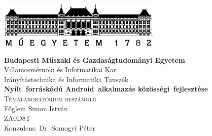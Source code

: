 \begin{titlepage}
	\begin{center}
		\includegraphics[keepaspectratio, width=8cm]{include/BME1782.eps} \\
		\vspace{5mm}

		\large \textbf{Budapesti Műszaki és Gazdaságtudományi Egyetem} \\
		Villamosmérnöki és Informatikai Kar \\
		Irányítástechnika és Informatika Tanszék \\
		\vspace{3cm}
		\huge \textbf{Nyílt~forráskódú Android~alkalmazás közösségi~fejlesztése}  \\
		\vspace{1cm}
		\textsc{Témalaboratórium beszámoló} \\
		\vfill
		\Large Főglein Simon István \\ ZA0D8T \\
		\vspace{1.6cm}
		\large Konzulens: Dr. Somogyi Péter
		\vfill
		\large {}
	\end{center}
\end{titlepage}
